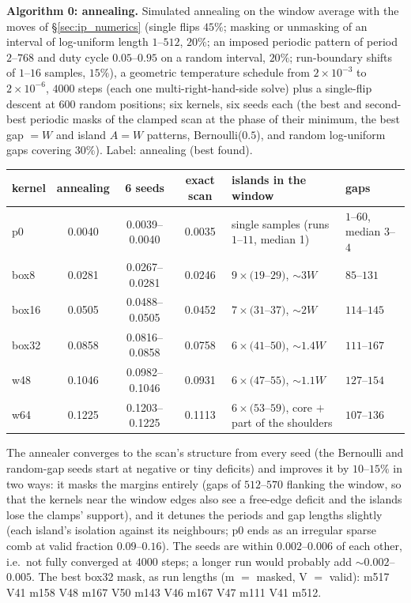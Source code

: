 \documentclass{article}
\numberwithin{equation}{section}   %
\begin{document}
{\bf Algorithm 0: annealing.}  Simulated annealing on the window average with the moves of
\S\ref{sec:ip_numerics} (single flips $45\%$; masking or unmasking of an interval of log-uniform length
$1$--$512$, $20\%$; an imposed periodic pattern of period $2$--$768$ and duty cycle $0.05$--$0.95$ on a
random interval, $20\%$; run-boundary shifts of $1$--$16$ samples, $15\%$), a geometric temperature
schedule from $2 \times 10^{-3}$ to $2 \times 10^{-6}$, $4000$ steps (each one multi-right-hand-side solve)
plus a single-flip descent at $600$ random positions; six kernels, six seeds each (the best and
second-best periodic masks of the clamped scan at the phase of their minimum, the best gap $= W$ and
island $A = W$ patterns, Bernoulli($0.5$), and random log-uniform gaps covering $30\%$).  Label: annealing
(best found).
\begin{center}\small
\begin{tabular}{l c c c l l}
\toprule
kernel & annealing & 6 seeds & exact scan & islands in the window & gaps \\
\midrule
p0    & 0.0040 & 0.0039--0.0040 & 0.0035 & single samples (runs $1$--$11$, median 1) & $1$--$60$, median $3$--$4$ \\
box8  & 0.0281 & 0.0267--0.0281 & 0.0246 & $9 \times (19$--$29)$, $\sim 3W$ & $85$--$131$ \\
box16 & 0.0505 & 0.0488--0.0505 & 0.0452 & $7 \times (31$--$37)$, $\sim 2W$ & $114$--$145$ \\
box32 & 0.0858 & 0.0816--0.0858 & 0.0758 & $6 \times (41$--$50)$, $\sim 1.4W$ & $111$--$167$ \\
w48   & 0.1046 & 0.0982--0.1046 & 0.0931 & $6 \times (47$--$55)$, $\sim 1.1W$ & $127$--$154$ \\
w64   & 0.1225 & 0.1203--0.1225 & 0.1113 & $6 \times (53$--$59)$, core $+$ part of the shoulders & $107$--$136$ \\
\bottomrule
\end{tabular}
\end{center}
The annealer converges to the scan's structure from every seed (the Bernoulli and random-gap seeds
start at negative or tiny deficits) and improves it by $10$--$15\%$ in two ways: it masks the margins
entirely (gaps of $512$--$570$ flanking the window, so that the kernels near the window edges also see a
free-edge deficit and the islands lose the clamps' support), and it detunes the periods and gap lengths
slightly (each island's isolation against its neighbours; p0 ends as an irregular sparse comb at valid
fraction $0.09$--$0.16$).  The seeds are within $0.002$--$0.006$ of each other, i.e.\ not fully converged
at $4000$ steps; a longer run would probably add $\sim 0.002$--$0.005$.  The best box32 mask, as run
lengths (m $=$ masked, V $=$ valid): m517 V41 m158 V48 m167 V50 m143 V46 m167 V47 m111 V41 m512.
\end{document}

